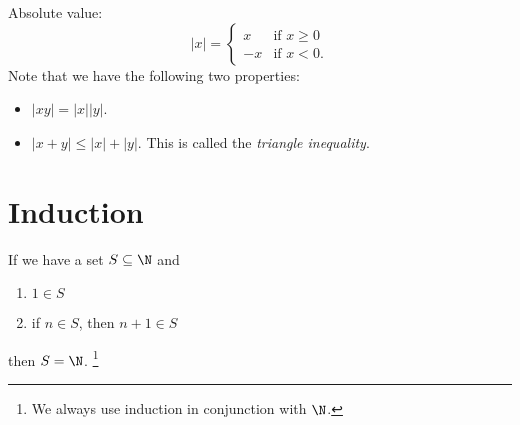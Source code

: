 \begin{tcolorbox}
  Absolute value:
  \[
    |x| =
    \begin{cases}
      x & \text{if $x \ge 0$} \\
      -x & \text{if $x < 0$}.
    \end{cases}
  \]
  Note that we have the following two properties:
  \begin{itemize}
    \item $|xy| = |x||y|$.
    \item $|x + y| \le |x| + |y|$. This is called the
      \textit{triangle inequality}.
  \end{itemize}
\end{tcolorbox}

\section{Induction}
If we have a set $S \subseteq \N$ and
\begin{enumerate}
  \item $1 \in S$
  \item if $n \in S$, then $n + 1 \in S$
\end{enumerate}
then $S = \N$.
\footnote{We always use induction in conjunction with
$\N$.}
